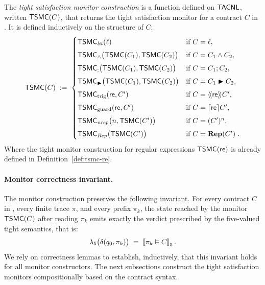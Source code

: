 \begin{definition}
 \label{def:tsmc}
The \emph{tight satisfaction monitor construction} is a function defined on $\cDL$, written  $\tsmc(C)$, that returns the tight satisfaction monitor for a contract
$C$ in \cDL. It is defined inductively on the structure of $C$:
 \[
\tsmc(C) \;:=\;
\begin{cases}
  \tsmc_{\mathit{lit}}(\ell)
    & \text{if } C = \ell, \\[0.4em]

  \tsmc_{\mathit{\wedge}}\big(\tsmc(C_1),\tsmc(C_2)\big)
    & \text{if } C = C_1 \wedge C_2, \\[0.4em]

  \tsmc_{\mathit{;}}\big(\tsmc(C_1),\tsmc(C_2)\big)
    & \text{if } C = C_1 ; C_2, \\[0.4em]

  \tsmc_{\mathit{\repair}}\big(\tsmc(C_1),\tsmc(C_2)\big)
    & \text{if } C = C_1 \repair C_2, \\[0.4em]

  \tsmc_{\trigg}(\re,C')
    & \text{if } C = \trig[\re]{C'}, \\[0.4em]

  \tsmc_{\guardd}(\re,C')
    & \text{if } C = \guard[\re]{C'}, \\[0.4em]

  \tsmc_{\mathit{nrep}}\big(n,\tsmc(C')\big)
    & \text{if } C = (C')^n, \\[0.4em]

  \tsmc_{\mathit{Rep}}\big(\tsmc(C')\big)
    & \text{if } C = \repit{C'}\;.
\end{cases}
\]
Where the tight monitor construction for regular expressions $\tsmc(\re)$ is already defined in Definition~\ref{def:tsmc-re}.
\end{definition}

\paragraph{Monitor correctness invariant.}
The monitor construction preserves the following invariant.
For every contract $C$ in \cDL, every finite trace $\pi$, and every prefix $\pi_k$,
the state reached by the monitor $\tsmc(C)$ after reading $\pi_k$
emits exactly the verdict prescribed by the five-valued tight semantics, that is:
\[
\lambda_5\bigl(\delta(q_0,\pi_k)\bigr) \;=\; \semfive{\pi_k \vDash C}.
\]
We rely on correctness lemmas to establish, inductively, that this invariant holds for all monitor constructors. The next subsections construct the tight satisfaction monitors compositionally based on the contract syntax. 

